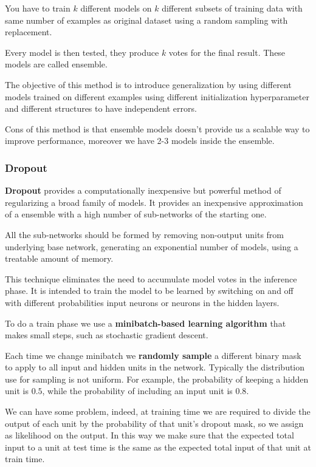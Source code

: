 You have to train $k$ different models on $k$ different subsets of training data
with same number of examples as original dataset using a random sampling with
replacement.

Every model is then tested, they produce $k$ votes for the final result. These
models are called ensemble.

The objective of this method is to introduce generalization by using different
models trained on different examples using different initialization hyperparameter
and different structures to have independent errors.

Cons of this method is that ensemble models doesn't provide us a scalable way to
improve performance, moreover we have 2-3 models inside the ensemble.
\subsubsection{Dropout}
\textbf{Dropout} provides a computationally inexpensive but powerful method of
regularizing a broad family of models. It provides an inexpensive approximation
of a ensemble with a high number of sub-networks of the starting one.

All the sub-networks should be formed by removing non-output units from underlying
base network, generating an exponential number of models, using a treatable
amount of memory.

This technique eliminates the need to accumulate model votes in the inference
phase. It is intended to train the model to be learned by switching on and off
with different probabilities input neurons or neurons in the hidden layers.

To do a train phase we use a \textbf{minibatch-based learning algorithm} that
makes small steps, such as stochastic gradient descent.

Each time we change minibatch we \textbf{randomly sample} a different binary mask
to apply to all input and hidden units in the network. Typically the distribution
use for sampling is not uniform. For example, the probability of keeping a hidden
unit is $0.5$, while the probability of including an input unit is $0.8$.

We can have some problem, indeed, at training time we are required to divide the
output of each unit by the probability of that unit's dropout mask, so we assign
as likelihood on the output. In this way we make sure that the expected total
input to a unit at test time is the same as the expected total input of that unit
at train time.

